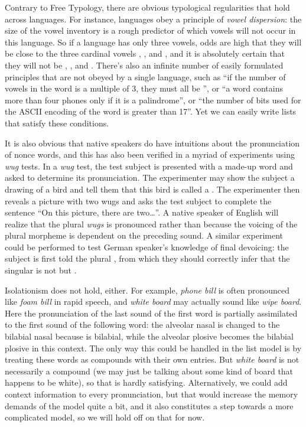 Contrary to Free Typology, there are obvious typological regularities that hold across languages.
For instance, languages obey a principle of \emph{vowel dispersion}: the size of the vowel inventory is a rough predictor of which vowels will not occur in this language.
So if a language has only three vowels, odds are high that they will be close to the three cardinal vowels , , and , and it is absolutely certain that they will not be , , and .
There's also an infinite number of easily formulated principles that are not obeyed by a single language, such as ``if the number of vowels in the word is a multiple of $3$, they must all be '', or ``a word contains more than four phones only if it is a palindrome'', or ``the number of bits used for the ASCII encoding of the word is greater than 17''.
Yet we can easily write lists that satisfy these conditions.

It is also obvious that native speakers do have intuitions about the pronunciation of nonce words, and this has also been verified in a myriad of experiments using \emph{wug} tests.
In a \emph{wug} test, the test subject is presented with a made-up word and asked to determine its pronunciation.
The experimenter may show the subject a drawing of a bird and tell them that this bird is called a \textipa{[w2g]}.
The experimenter then reveals a picture with two wugs and asks the test subject to complete the sentence ``On this picture, there are two\ldots''.
A native speaker of English will realize that the plural \emph{wugs} is pronounced \textipa{[w2gz]} rather than \textipa{[w2gs]} because the voicing of the plural morpheme is dependent on the preceding sound.
A similar experiment could be performed to test German speaker's knowledge of final devoicing: the subject is first told the plural \textipa{[vag@]}, from which they should correctly infer that the singular is not \textipa{[vag]} but \textipa{[vak]}. 

Isolationism does not hold, either.
For example, \emph{phone bill} is often pronounced like \emph{foam bill} in rapid speech, and \emph{white board} may actually sound like \emph{wipe board}.
Here the pronunciation of the last sound of the first word is partially assimilated to the first sound of the following word: the alveolar nasal \textipa{[n]} is changed to the bilabial nasal \textipa{[m]} because \textipa{[b]} is bilabial, while the alveolar plosive \textipa{[t]} becomes the bilabial plosive \textipa{[p]} in this context.
The only way this could be handled in the list model is by treating these words as compounds with their own entries.
But \emph{white board} is not necessarily a compound (we may just be talking about some kind of board that happens to be white), so that is hardly satisfying.
Alternatively, we could add context information to every pronunciation, but that would increase the memory demands of the model quite a bit, and it also constitutes a step towards a more complicated model, so we will hold off on that for now.

